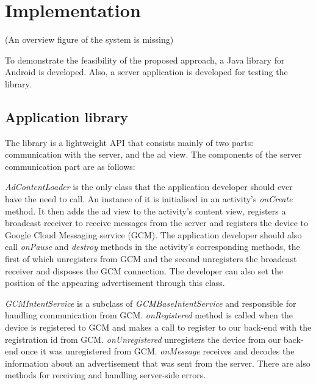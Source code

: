
\chapter{Implementation} %





\ifpdf
    \graphicspath{{X/figures/PNG/}{X/figures/PDF/}{X/figures/}}
\else
    \graphicspath{{X/figures/EPS/}{X/figures/}}
\fi

(An overview figure of the system is missing)


To demonstrate the feasibility of the proposed approach, a Java library for Android is developed. Also, a server application is developed for testing the library.

\section{Application library}

The library is a lightweight API that consists mainly of two parts: communication with the server,  and the ad view. The components of the server communication part are as follows:

\textit{AdContentLoader} is the only class that the application developer should ever have the need to call. An instance of it is initialised in an activity's \textit{onCreate} method. It then adds the ad view to the activity's content view, registers a broadcast receiver to receive messages from the server and registers the device to Google Cloud Messaging service (GCM).\cite{notifications:gcm} The application developer should also call \textit{onPause} and \textit{destroy} methods in the activity's corresponding methods, the first of which unregisters from GCM and the second unregisters the broadcast receiver and disposes the GCM connection. The developer can also set the position of the appearing advertisement through this class.

\textit{GCMIntentService} is a subclass of \textit{GCMBaseIntentService} and responsible for handling communication from GCM. \textit{onRegistered} method is called when the device is registered to GCM and makes a call to register to our back-end with the registration id from GCM. \textit{onUnregistered} unregisters the device from our back-end once it was unregistered from GCM. \textit{onMessage} receives and decodes the information about an advertisement that was sent from the server. There are also methods for receiving and handling server-side errors.

